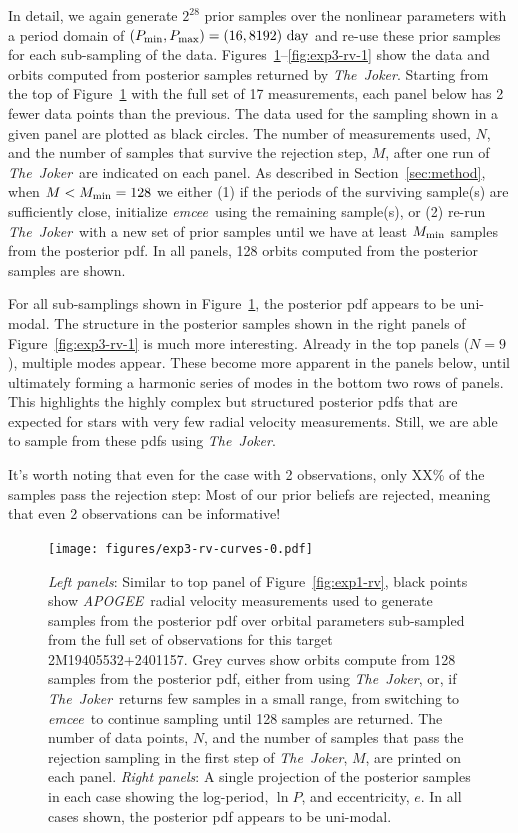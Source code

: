 \documentclass[manuscript, letterpaper]{aastex6}
\newcommand{\project}[1]{\textsl{#1}}
\newcommand{\acronym}[1]{{\small{#1}}}
\newcommand{\apogee}{\project{\acronym{APOGEE}}}
\newcommand{\samplername}{\project{The~Joker}}
\newcommand{\emcee}{\project{emcee}}
\newcommand{\sectionname}{Section}
\newcommand{\figname}{Figure}
\begin{document}
In detail, we again generate $2^{28}$ prior samples over the nonlinear
parameters with a period domain of $(P_{\rm min}, P_{\rm max}) = (16, 8192)~{\rm
day}$ and re-use these prior samples for each sub-sampling of the data.
\figname s~\ref{fig:exp3-rv-0}--\ref{fig:exp3-rv-1} show the data and orbits
computed from posterior samples returned by \samplername.
Starting from the top of \figname~\ref{fig:exp3-rv-0} with the full set of 17
measurements, each panel below has 2 fewer data points than the previous.
The data used for the sampling shown in a given panel are plotted as black
circles.
The number of measurements used, $N$, and the number of samples that survive the
rejection step, $M$, after one run of \samplername\ are indicated on each panel.
As described in \sectionname~\ref{sec:method}, when $M < M_{\rm min}=128$ we
either (1) if the periods of the surviving sample(s) are sufficiently close,
initialize \emcee\ using the remaining sample(s), or (2) re-run \samplername\
with a new set of prior samples until we have at least $M_{\rm min}$ samples
from the posterior pdf.
In all panels, 128 orbits computed from the posterior samples are shown.

For all sub-samplings shown in \figname~\ref{fig:exp3-rv-0}, the posterior pdf
appears to be uni-modal.
The structure in the posterior samples shown in the right panels of
\figname~\ref{fig:exp3-rv-1} is much more interesting.
Already in the top panels ($N=9$), multiple modes appear.
These become more apparent in the panels below, until ultimately forming a
harmonic series of modes in the bottom two rows of panels.
This highlights the highly complex but structured posterior pdfs that are
expected for stars with very few radial velocity measurements.
Still, we are able to sample from these pdfs using \samplername.

It's worth noting that even for the case with 2 observations, only XX\% of the
samples pass the rejection step:
Most of our prior beliefs are rejected, meaning that even 2 observations can be
informative!

\begin{figure}[p]
\begin{center}
\texttt{[image: figures/exp3-rv-curves-0.pdf]}
\end{center}
\caption{%
{\sl Left panels}: Similar to top panel of \figname~\ref{fig:exp1-rv}, black
points show \apogee\ radial velocity measurements used to generate samples from
the posterior pdf over orbital parameters sub-sampled from the full set of
observations for this target 2M19405532+2401157.
Grey curves show orbits compute from 128 samples from the posterior pdf, either
from using \samplername, or, if \samplername\ returns few samples in a small
range, from switching to \emcee\ to continue sampling until 128 samples are
returned.
The number of data points, $N$, and the number of samples that pass the
rejection sampling in the first step of \samplername, $M$, are printed on each
panel.
{\sl Right panels}: A single projection of the posterior samples in each case
showing the log-period, $\ln P$, and eccentricity, $e$.
In all cases shown, the posterior pdf appears to be uni-modal.
\label{fig:exp3-rv-0}}
\end{figure}
\end{document}
